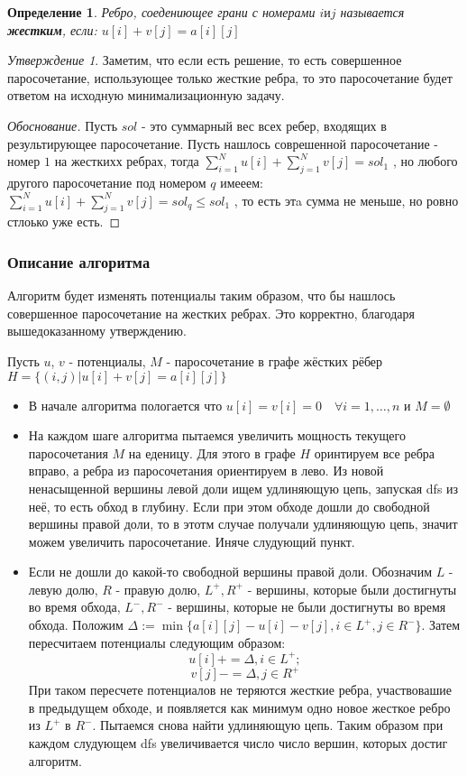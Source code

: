 \documentclass[a4paper,14pt]{extarticle}
\newtheorem{definition}{Определение}
\theoremstyle{remark} %
\newtheorem{claim}{Утверждение}
\begin{document}
\begin{definition}
    Ребро, соедениющее грани с номерами $i и j$ называется \textbf{жестким}, если: $u[i] + v[j] = a[i][j]$
\end{definition}

\begin{claim}
Заметим, что если есть решение, то есть совершенное паросочетание, использующее только жесткие ребра, то это паросочетание будет 
ответом на исходную минимализационную задачу.
\end{claim}
\begin{proof}[Обоснование]
    Пусть $sol$ - это суммарный вес всех ребер, входящих в  результирующее паросочетание.\newline
    Пусть нашлось соврешенной паросочетание - номер $1$ на жесткихх ребрах, тогда $\sum_{i = 1}^{N}u[i] + \sum_{j=1}^{N}v[j] = sol_{1}$
    , но любого другого паросочетание под номером $q$ имееем: $\sum_{i = 1}^{N}u[i] + \sum_{j=1}^{N}v[j] = sol_{q} \leq sol_{1}$
    ,  то есть этa сумма не меньше, но ровно стлоько уже есть.
\end{proof}

\subsubsection{Описание алгоритма}
Алгоритм будет изменять потенциалы таким образом, что бы нашлось совершенное паросочетание на жестких ребрах. Это корректно, благодаря
вышедоказанному утверждению.\par
Пусть $u$, $v$ - потенциалы, $M$ - паросочетание в графе жёстких рёбер $H = \{(i,j) | u[i]+v[j] = a[i][j]\}$
\begin{itemize}
    \item В начале алгоритма пологается что $u[i] = v[i] = 0 \quad \forall i = 1,\dots,n$ и $M = \emptyset$
    \item На каждом шаге алгоритма пытаемся увеличить мощность текущего паросочетания $M$ на еденицу. Для
        этого в графе $H$ оринтируем все ребра вправо, а ребра из паросочетания ориентируем в лево.
        Из новой ненасыщенной вершины левой доли ищем удлиняющую цепь, запуская dfs из неё, то есть обход в глубину. Если при этом  обходе дошли до 
        свободной вершины правой доли, то в этотм случае получали удлиняющую цепь, значит можем увеличить паросочетание. Иняче слудующий пункт.
    \item Если не дошли до какой-то свободной вершины правой доли. Обозначим $L$ - левую долю, $R$ - правую долю, $L^{+}, R^{+}$ -
        вершины, которые были достигнуты во время обхода, $L^{-}, R^{-}$ - вершины, которые не были достигнуты во время обхода.
        Положим $\Delta := \min \big\{a[i][j] - u[i] - v[j], i \in L^{+} ,j \in R^{-}\big\}$. Затем пересчитаем потенциалы следующим 
        образом: $$u[i] += \Delta,  i \in L^{+};$$ $$v[j] -= \Delta, j \in R^{+}$$
        При таком пересчете потенциалов не теряются жесткие ребра, участвовашие в предыдущем обходе, и появляется как минимум одно 
        новое жесткое ребро из $L^{+}$ в $R^{-}$. Пытаемся снова найти удлиняющую цепь. Таким образом при каждом слудующем dfs увеличивается
        число число вершин, которых достиг алгоритм.
\end{itemize}
\end{document}
